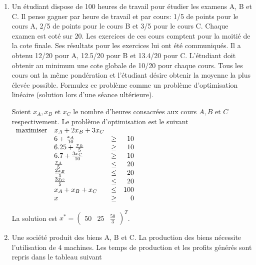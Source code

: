 \begin{enumerate}


  \item Un étudiant dispose de 100 heures de travail pour étudier les examens A, B et C. Il pense gagner par heure de travail et par
    cours: 1/5 de points pour le cours A, 2/5 de points pour le cours B et 3/5 pour le cours C. Chaque examen est coté sur 20. Les
    exercices de ces cours comptent pour la moitié de la cote finale. Ses résultats pour les exercices lui ont été communiqués. Il a
    obtenu 12/20 pour A, 12.5/20 pour B et 13.4/20 pour C.  L'étudiant doit obtenir au minimum une cote globale de 10/20 pour chaque cours. Tous
    les cours ont la même pondération et l'étudiant désire obtenir la  moyenne la plus élevée possible.  Formulez ce problème comme un problème d'optimisation
    linéaire (solution lors d'une séance ultérieure).
    \begin{solution}
      Soient $x_{A}, x_{B}\text{ et }x_{C}$ le nombre d'heures consacrées aux cours $A, B$ et $C$ respectivement.
      Le problème d'optimisation est le suivant
      $
      \begin{array}{llcr}
        \mbox{maximiser} & x_A + 2x_B + 3x_C\\
        & 6 + \frac{x_A}{10} & \geq & 10\\
        & 6.25 + \frac{x_B}{5} & \geq & 10\\
        & 6.7 + \frac{3x_C}{10} & \geq & 10\\
        & \frac{x_A}{5} & \leq & 20\\
        & \frac{2x_B}{5} & \leq & 20\\
        & \frac{3x_C}{5} & \leq & 20\\
        & x_A + x_B + x_C & \leq & 100\\
        & x & \geq & 0
      \end{array}
      $

      La solution est
      $x^{*} = \begin{pmatrix}
        50 & 25 & \frac{50}{3}
      \end{pmatrix}^{T}$.

    \end{solution}


  \item Une société produit des biens A, B et C. La production des biens nécessite l'utilisation de 4 machines. Les temps de production
    et les profits générés sont repris dans le tableau suivant\\


\end{enumerate}
